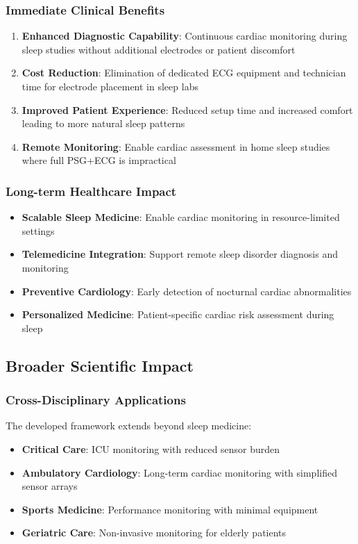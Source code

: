 \documentclass[11pt]{article}
\begin{document}
\subsubsection{Immediate Clinical Benefits}
\begin{enumerate}
    \item \textbf{Enhanced Diagnostic Capability}: Continuous cardiac monitoring during sleep studies without additional electrodes or patient discomfort
    
    \item \textbf{Cost Reduction}: Elimination of dedicated ECG equipment and technician time for electrode placement in sleep labs
    
    \item \textbf{Improved Patient Experience}: Reduced setup time and increased comfort leading to more natural sleep patterns
    
    \item \textbf{Remote Monitoring}: Enable cardiac assessment in home sleep studies where full PSG+ECG is impractical
\end{enumerate}

\subsubsection{Long-term Healthcare Impact}
\begin{itemize}
    \item \textbf{Scalable Sleep Medicine}: Enable cardiac monitoring in resource-limited settings
    \item \textbf{Telemedicine Integration}: Support remote sleep disorder diagnosis and monitoring
    \item \textbf{Preventive Cardiology}: Early detection of nocturnal cardiac abnormalities
    \item \textbf{Personalized Medicine}: Patient-specific cardiac risk assessment during sleep
\end{itemize}

\subsection{Broader Scientific Impact}

\subsubsection{Cross-Disciplinary Applications}
The developed framework extends beyond sleep medicine:
\begin{itemize}
    \item \textbf{Critical Care}: ICU monitoring with reduced sensor burden
    \item \textbf{Ambulatory Cardiology}: Long-term cardiac monitoring with simplified sensor arrays
    \item \textbf{Sports Medicine}: Performance monitoring with minimal equipment
    \item \textbf{Geriatric Care}: Non-invasive monitoring for elderly patients
\end{itemize}
\end{document}

